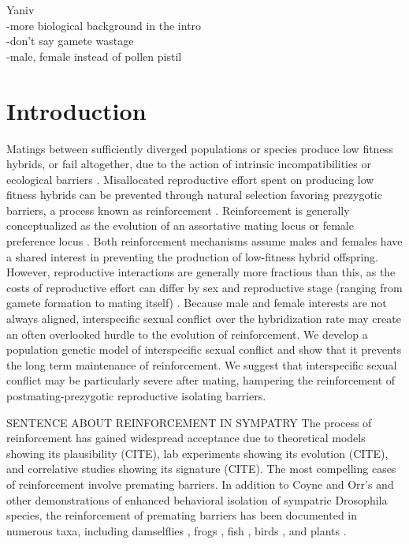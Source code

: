 \documentclass[11pt]{article}
\begin{document}
Yaniv\\
-more biological background in the intro\\
-don't say gamete wastage\\
-male, female instead of pollen pistil\\


\section*{Introduction}


Matings between sufficiently diverged populations or species produce low fitness hybrids, or fail altogether, due to the action of intrinsic incompatibilities \citep{dobzhansky1937, muller1942} or ecological barriers \citep{schluter1998}. %
Misallocated reproductive effort spent on producing low fitness hybrids can be prevented through natural selection favoring prezygotic barriers, a process known as reinforcement \citep{dobzhansky1937, servedio2003}.
Reinforcement is generally conceptualized as the evolution of an assortative mating locus \citep{felsenstein1981} or female preference locus \citep{servedio1997}.   
Both reinforcement mechanisms assume males and females have a shared interest in preventing the production of low-fitness hybrid offspring. 
However, reproductive interactions are generally more fractious than this, as the costs of reproductive effort can differ by sex and reproductive stage (ranging from gamete formation to mating itself) \citep{arnqvistandrowebook}.  
Because male and female interests are not always aligned, interspecific sexual conflict over the hybridization rate \citep{parker1998}  may create an often overlooked hurdle to the evolution of reinforcement.   
We develop a population genetic model of interspecific sexual conflict and show that it prevents the long term maintenance of reinforcement.  
We suggest that interspecific sexual conflict may be particularly severe after mating, hampering the reinforcement of postmating-prezygotic reproductive isolating barriers.  

SENTENCE ABOUT REINFORCEMENT IN SYMPATRY
The process of reinforcement has gained widespread acceptance due to theoretical models showing its plausibility (CITE), lab experiments showing its evolution (CITE), and correlative studies showing its signature (CITE).  
The most compelling cases of reinforcement involve premating barriers. 
In addition to Coyne and Orr's \citeyearpar{coyneandorrbook} and other \citeyearpar{coyneandorr1989, coyneandorr1997} demonstrations of enhanced behavioral isolation of sympatric Drosophila species, the reinforcement of premating barriers has been documented in numerous taxa, including damselflies \citep{waage1979},  frogs \citep{blair1974, littlejohn1968, hobel2003}, fish \citep{rundle1998}, birds \citep{ratcliffe1983,saetre1997}, and plants \citep{hopkins2013}. %
\end{document}
